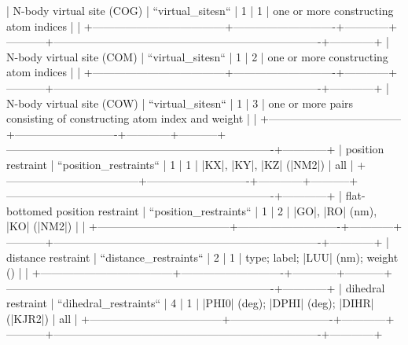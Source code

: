             | N-body virtual site (COG)          | ``virtual_sitesn``         | 1          | 1         | one or more constructing atom indices                                   |            | 
            +------------------------------------+----------------------------+------------+-----------+-------------------------------------------------------------------------+------------+
            | N-body virtual site (COM)          | ``virtual_sitesn``         | 1          | 2         | one or more constructing atom indices                                   |            | 
            +------------------------------------+----------------------------+------------+-----------+-------------------------------------------------------------------------+------------+
            | N-body virtual site (COW)          | ``virtual_sitesn``         | 1          | 3         | one or more pairs consisting of constructing atom index and weight      |            | 
            +------------------------------------+----------------------------+------------+-----------+-------------------------------------------------------------------------+------------+
            | position restraint                 | ``position_restraints``    | 1          | 1         | |KX|, |KY|, |KZ| (|NM2|)                                                | all        |
            +------------------------------------+----------------------------+------------+-----------+-------------------------------------------------------------------------+------------+
            | flat-bottomed position restraint   | ``position_restraints``    | 1          | 2         | |GO|, |RO| (nm), |KO| (|NM2|)                                           |            | 
            +------------------------------------+----------------------------+------------+-----------+-------------------------------------------------------------------------+------------+
            | distance restraint                 | ``distance_restraints``    | 2          | 1         | type; label; |LUU| (nm); weight ()                                      |            | 
            +------------------------------------+----------------------------+------------+-----------+-------------------------------------------------------------------------+------------+
            | dihedral restraint                 | ``dihedral_restraints``    | 4          | 1         | |PHI0| (deg); |DPHI| (deg); |DIHR| (|KJR2|)                             | all        | 
            +------------------------------------+----------------------------+------------+-----------+-------------------------------------------------------------------------+------------+
